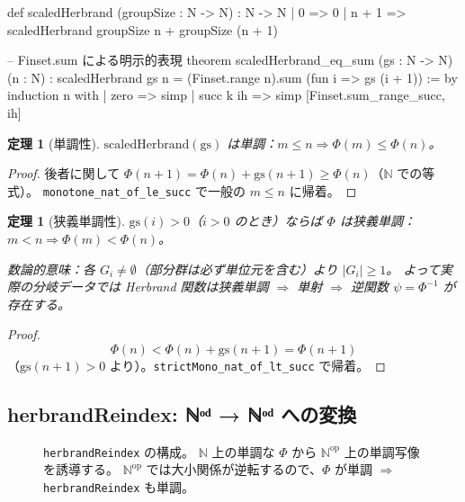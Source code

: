 \documentclass[a4paper,11pt]{ltjsarticle}
\theoremstyle{definition}
\theoremstyle{plain}
\newtheorem{theorem}[definition]{定理}
\theoremstyle{remark}
\newcommand{\Phi}{\varPhi}
\begin{document}
\begin{leancode}
def scaledHerbrand (groupSize : N -> N) : N -> N
  | 0     => 0
  | n + 1 => scaledHerbrand groupSize n + groupSize (n + 1)

-- Finset.sum による明示的表現
theorem scaledHerbrand_eq_sum (gs : N -> N) (n : N) :
    scaledHerbrand gs n = (Finset.range n).sum (fun i => gs (i + 1)) := by
  induction n with
  | zero     => simp
  | succ k ih => simp [Finset.sum_range_succ, ih]
\end{leancode}

\begin{theorem}[単調性]\label{thm:scaled-herbrand-mono}
  $\mathrm{scaledHerbrand}(\mathrm{gs})$ は単調：$m \leq n \Rightarrow \Phi(m) \leq \Phi(n)$。
\end{theorem}

\begin{proof}
  後者に関して $\Phi(n+1) = \Phi(n) + \mathrm{gs}(n+1) \geq \Phi(n)$（$\mathbb{N}$ での等式）。
  \texttt{monotone\_nat\_of\_le\_succ} で一般の $m \leq n$ に帰着。
\end{proof}

\begin{theorem}[狭義単調性]\label{thm:scaled-herbrand-strict-mono}
  $\mathrm{gs}(i) > 0$（$i > 0$ のとき）ならば $\Phi$ は狭義単調：
  $m < n \Rightarrow \Phi(m) < \Phi(n)$。

  数論的意味：各 $G_i \neq \emptyset$（部分群は必ず単位元を含む）より $|G_i| \geq 1$。
  よって実際の分岐データでは Herbrand 関数は狭義単調 $\Rightarrow$ 単射
  $\Rightarrow$ 逆関数 $\psi = \Phi^{-1}$ が存在する。
\end{theorem}

\begin{proof}
  \[
    \Phi(n) < \Phi(n) + \mathrm{gs}(n+1) = \Phi(n+1)
  \]
  （$\mathrm{gs}(n+1) > 0$ より）。\texttt{strictMono\_nat\_of\_lt\_succ} で帰着。
\end{proof}

\subsection{herbrandReindex: ℕᵒᵈ → ℕᵒᵈ への変換}

\begin{figure}[H]
\centering
{}
\caption{\texttt{herbrandReindex} の構成。
$\mathbb{N}$ 上の単調な $\Phi$ から $\mathbb{N}^{\mathrm{op}}$ 上の単調写像を誘導する。
$\mathbb{N}^{\mathrm{op}}$ では大小関係が逆転するので、$\Phi$ が単調 $\Rightarrow$
\texttt{herbrandReindex} も単調。}
\label{fig:herbrand-reindex}
\end{figure}
\end{document}
